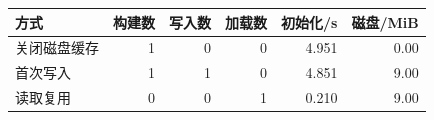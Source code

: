 \begin{center}\small\begin{tabular}{@{}lrrrrr@{}}\toprule
方式 & 构建数 & 写入数 & 加载数 & 初始化/s & 磁盘/MiB\\\midrule
关闭磁盘缓存 & 1 & 0 & 0 & 4.951 & 0.00\\
首次写入 & 1 & 1 & 0 & 4.851 & 9.00\\
读取复用 & 0 & 0 & 1 & 0.210 & 9.00\\
\bottomrule\end{tabular}\end{center}
